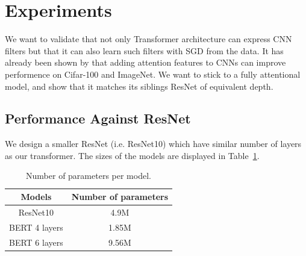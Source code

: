 \documentclass{article} %
\begin{document}
\section{Experiments}
\label{sec:experiments}

We want to validate that not only Transformer architecture can express CNN filters
but that it can also learn such filters with SGD from the data.
%
It has already been shown by \citep{belloAttentionAugmentedConvolutional2019} that 
adding attention features to CNNs can improve performence on Cifar-100 and ImageNet.
%
We want to stick to a fully attentional model, and show that it matches its siblings ResNet of equivalent depth.

\subsection{Performance Against ResNet}

We design a smaller ResNet (i.e. ResNet10) which have similar number of layers as our transformer.
The sizes of the models are displayed in Table~\ref{tab:parameter_size}. 

\begin{table}
  \centering
  \begin{tabular}{cc}
    \toprule
    Models & Number of parameters\\
    \midrule
    ResNet10 & 4.9M\\
    BERT 4 layers & 1.85M\\
    BERT 6 layers & 9.56M \\
    \bottomrule
  \end{tabular}
  \caption{Number of parameters per model.}
  \label{tab:parameter_size}
\end{table}
\end{document}
